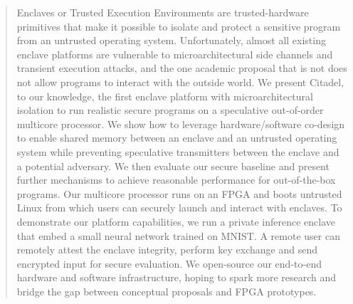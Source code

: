 \begin{abstract}

Enclaves or Trusted Execution Environments are trusted-hardware primitives that make it possible to isolate and protect a sensitive program from an untrusted operating system.
Unfortunately, almost all existing enclave platforms are vulnerable to microarchitectural side channels and transient execution attacks, and the one academic proposal that is not
does not allow programs to interact with the outside world.
We present Citadel, to our knowledge, the first enclave platform with microarchitectural isolation to run realistic secure programs on a speculative out-of-order multicore processor.
We show how to leverage hardware/software co-design to enable shared memory between an enclave and an untrusted operating system while preventing speculative transmitters between the enclave and a potential adversary.
We then evaluate our secure baseline and present further mechanisms to achieve reasonable performance for out-of-the-box programs.
Our multicore processor runs on an FPGA and boots untrusted Linux from which users can securely launch and interact with enclaves.
To demonstrate our platform capabilities, we run a private inference enclave that embed a small neural network trained on MNIST.
A remote user can remotely attest the enclave integrity, perform key exchange and send encrypted input for secure evaluation.
We open-source our end-to-end hardware and software infrastructure, hoping to spark more research and bridge the gap between conceptual proposals and FPGA prototypes.
\end{abstract}